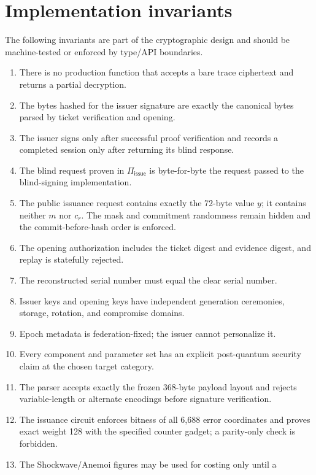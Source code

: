 \documentclass[11pt]{article}
\newcommand{\Piiss}{\Pi_{\mathsf{issue}}}
\begin{document}
\section{Implementation invariants}

The following invariants are part of the cryptographic design and should be
machine-tested or enforced by type/API boundaries.

\begin{enumerate}[label=INV-\arabic*,leftmargin=*]
  \item There is no production function that accepts a bare trace ciphertext
  and returns a partial decryption.
  \item The bytes hashed for the issuer signature are exactly the canonical
  bytes parsed by ticket verification and opening.
  \item The issuer signs only after successful proof verification and records a
  completed session only after returning its blind response.
  \item The blind request proven in $\Piiss$ is byte-for-byte the request passed
  to the blind-signing implementation.
  \item The public issuance request contains exactly the 72-byte value $y$; it
  contains neither $m$ nor $c_r$.  The mask and commitment randomness remain
  hidden and the commit-before-hash order is enforced.
  \item The opening authorization includes the ticket digest and evidence
  digest, and replay is statefully rejected.
  \item The reconstructed serial number must equal the clear serial number.
  \item Issuer keys and opening keys have independent generation ceremonies,
  storage, rotation, and compromise domains.
  \item Epoch metadata is federation-fixed; the issuer cannot personalize it.
  \item Every component and parameter set has an explicit post-quantum security
  claim at the chosen target category.
  \item The parser accepts exactly the frozen 368-byte payload layout and
  rejects variable-length or alternate encodings before signature verification.
  \item The issuance circuit enforces bitness of all 6,688 error coordinates
  and proves exact weight 128 with the specified counter gadget; a parity-only
  check is forbidden.
  \item The Shockwave/Anemoi figures may be used for costing only until a

\end{enumerate}
\end{document}
